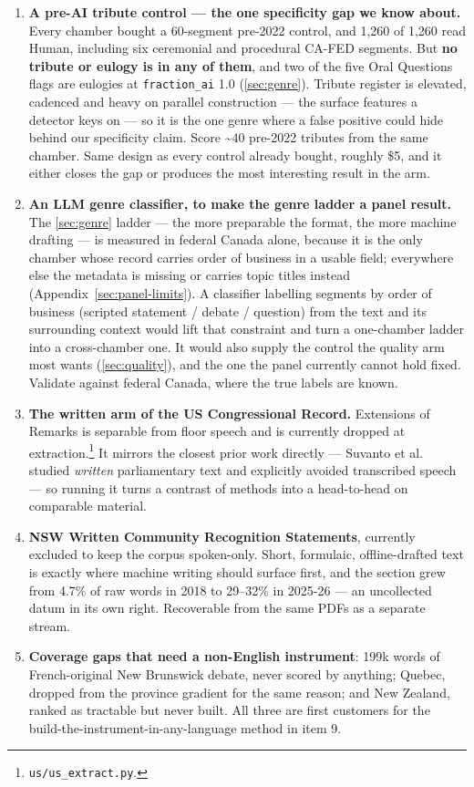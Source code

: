 \begin{enumerate}
\def\labelenumi{\arabic{enumi}.}
\setcounter{enumi}{11}
\item
  \textbf{A pre-AI tribute control --- the one specificity gap we know about.} Every
  chamber bought a 60-segment pre-2022 control, and 1,260 of 1,260 read Human,
  including six ceremonial and procedural CA-FED segments. But \textbf{no tribute or
  eulogy is in any of them}, and two of the five Oral Questions flags are
  eulogies at \texttt{fraction\_ai} 1.0 (\cref{sec:genre}). Tribute register is elevated,
  cadenced and heavy on parallel construction --- the surface features a
  detector keys on --- so it is the one genre where a false positive could hide
  behind our specificity claim. Score \textasciitilde40 pre-2022 tributes from the same
  chamber. Same design as every control already bought, roughly \$5, and it
  either closes the gap or produces the most interesting result in the arm.
\item
  \textbf{An LLM genre classifier, to make the genre ladder a panel result.} The
  \cref{sec:genre} ladder --- the more preparable the format, the more machine drafting --- is
  measured in federal Canada alone, because it is the only chamber whose
  record carries order of business in a usable field; everywhere else the
  metadata is missing or carries topic titles instead (Appendix~\ref{sec:panel-limits}). A
  classifier labelling segments by order of business (scripted statement /
  debate / question) from the text and its surrounding context would lift that
  constraint and turn a one-chamber ladder into a cross-chamber one. It would
  also supply the control the quality arm most wants (\cref{sec:quality}), and the one the
  panel currently cannot hold fixed. Validate against federal Canada, where
  the true labels are known.
\item
  \textbf{The written arm of the US Congressional Record.} Extensions of Remarks
  is separable from floor speech and is currently dropped at
  extraction.\footnote{\texttt{us/us\_extract.py}.} It mirrors the closest prior work directly --- Suvanto
  et al. studied \emph{written} parliamentary text and explicitly avoided
  transcribed speech --- so running it turns a contrast of methods into a
  head-to-head on comparable material.
\item
  \textbf{NSW Written Community Recognition Statements}, currently excluded to keep
  the corpus spoken-only. Short, formulaic, offline-drafted text is exactly
  where machine writing should surface first, and the section grew from 4.7\%
  of raw words in 2018 to 29--32\% in 2025-26 --- an uncollected datum in its own
  right. Recoverable from the same PDFs as a separate stream.
\item
  \textbf{Coverage gaps that need a non-English instrument}: 199k words of
  French-original New Brunswick debate, never scored by anything; Quebec,
  dropped from the province gradient for the same reason; and New Zealand,
  ranked as tractable but never built. All three are first customers for the
  build-the-instrument-in-any-language method in item 9.
\end{enumerate}

